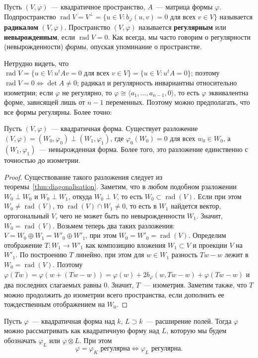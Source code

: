 \documentclass[a4paper,oneside,12pt]{article}
\theoremstyle{plain} { \swapnumbers
\newtheorem{theorem}{Теорема}[subsection]
\newtheorem{corollary}[theorem]{Следствие}
\newtheorem{lemma}[theorem]{Лемма}
\newtheorem{proposition}[theorem]{Утверждение}
\newtheorem{claim}[theorem]{Факт}
}
\theoremstyle{definition} { \swapnumbers
\newtheorem{definition}[theorem]{Определение}
\newtheorem{notation}[theorem]{Обозначение}
\newtheorem{remark}[theorem]{Замечание}
\newtheorem{remarks}[theorem]{Замечания}
\newtheorem{example}[theorem]{Пример}
\newtheorem{examples}[theorem]{Примеры}
\newtheorem{sssection}[theorem]{}
}
\def\ph{\varphi}
\def\la{\langle}
\def\ra{\rangle}
\def\rad{\operatorname{rad}}
\begin{document}
Пусть $(V,\ph)$~--- квадратичное пространство, $A$~--- матрица формы $\ph$. Подпространство
$\rad V=V^\perp=\{u\in V:b_\ph(u,v)=0\text{ для всех } v\in V\}$ называется {\bf радикалом}
$(V,\ph)$. Пространство $(V,\ph)$ называется {\bf регулярным} или {\bf невырожденным},
если $\rad V=0$. Как всегда, мы часто говорим о регулярности (невырожденности) {\it формы},
опуская упоминание о пространстве.

Нетрудно видеть, что $\rad V=\{u\in V:u^tAv=0\text{ для всех } v\in V\}=\{u\in V:u^tA=0\}$;
поэтому $\rad V=0\Longleftrightarrow \det A\neq 0$; радикал и регулярность инвариантны относительно
изометрии; если $\ph$ не регулярно, то $\ph\cong\la a_1,\dots,a_{n-1},0\ra$, то есть
$\ph$ эквивалентна форме, зависящей лишь от $n-1$ переменных. Поэтому можно предполагать,
что все формы регулярны.
Более точно:
\begin{theorem}\label{thm:regular_part}
Пусть $(V,\ph)$~--- квадратичная форма. Существует разложение $(V,\ph)=(W_0,\ph_0)\perp(W_1,\ph_1)$,
где $\ph_0(W_0)=0$ для всех $w_0\in W_0$, а $(W_1,\ph_1)$~--- невырожденная форма. Более того,
это разложение единственно с точностью до изометрии.
\end{theorem}
\begin{proof}
Существование такого разложения следует из теоремы~\ref{thm:diagonalisation}.
Заметим, что в любом подобном рзаложении $W_0\perp W_0$ и $W_0\perp W_1$, откуда
$W_0\perp V$, то есть $W_0\subset\rad(V)$. Если при этом $W_0\neq\rad(V)$, то
$\rad(V)\cap W_1\neq 0$, то есть в $W_1$ найдется вектор, ортогональный $V$,
чего не может быть по невырожденности $W_1$. Значит, $W_0=\rad(V)$.
Возьмем теперь два таких разложения:
$V=W_0\oplus W_1=W'_0\oplus W'_1$, при этом $W_0=W'_0=\rad(V)$.
Определим отображение $T\colon W_1\to W'_1$ как композицию
вложения $W_1\subset V$ и проекции $V$ на $W'_1$. По построению $T$
линейно, при этом для $w\in W_1$ разность $Tw-w$ лежит в $W_0=\rad(V)$.
Поэтому $\ph(Tw)=\ph(w+(Tw-w))=\ph(w)+2b_\ph(w,Tw-w)+\ph(Tw-w)$ и
два последних слагаемых равны 0. Значит, $T$~--- изометрия.
Заметим также, что $T$ можно продолжить до изометрии всего пространства,
если дополнить ее тождественным отображением на $W_0$.
\end{proof}

Пусть $\ph$~--- квадратичная форма над $k$, $L\supset k$~--- расширение полей. Тогда
$\ph$ можно рассматривать как квадратичную форму над $L$, которую мы будем обозначать
$\ph_L$ или $\ph\otimes L$. При этом
$$
\ph=\ph_K\text{ регулярна}\Longleftrightarrow \ph_L\text{ регулярна}.
$$
\end{document}

